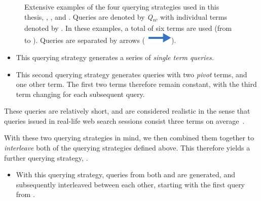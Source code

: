 \begin{figure}[t!]
    \centering
    \caption[Querying strategies example]{Extensive examples of the four querying strategies used in this thesis, , , and . Queries are denoted by \emph{Q\textsubscript{n}}, with individual terms denoted by . In these examples, a total of six terms are used (from  to ). Queries are separated by arrows (~\includegraphics[height=\fontcharht\font`\d]{figures/src/arrow-blue-right.pdf}).}
    \label{fig:querying}
\end{figure}

\begin{itemize}
    \item{ This querying strategy generates a series of \emph{single term queries.}}
    \item{ This second querying strategy generates queries with two \emph{pivot} terms, and one other term. The first two terms therefore remain constant, with the third term changing for each subsequent query.}
\end{itemize}

These queries are relatively short, and are considered realistic in the sense that queries issued in real-life web search sessions consist three terms on average~\citep{keskustalo2009querying}.

With these two querying strategies in mind, we then combined them together to \emph{interleave} both of the querying strategies defined above. This therefore yields a further querying strategy, .

\begin{itemize}
    \item{ With this querying strategy, queries from both  and  are generated, and subsequently interleaved between each other, starting with the first query from .}
\end{itemize}

